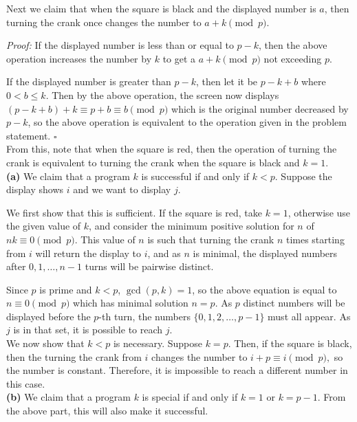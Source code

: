 \documentclass{article}
\begin{document}
     Next we claim that when the square is black and the displayed number is $a$, then turning the crank once changes the number to $a + k \pmod p$.

     \textit{Proof:} If the displayed number is less than or equal to $p - k$, then the above operation increases the number by $k$ to get a $a + k \pmod p$ not exceeding $p$.
     
     If the displayed number is greater than $p - k$, then let it be $p - k + b$ where $0 < b \leq k$. Then by the above operation, the screen now displays $(p - k + b) + k \equiv p + b \equiv b\pmod p$ which is the original number decreased by $p - k$, so the above operation is equivalent to the operation given in the problem statement. $\square$ \\

     From this, note that when the square is red, then the operation of turning the crank is equivalent to turning the crank when the square is black and $k = 1$.\\

     \textbf{(a)} We claim that a program $k$ is successful if and only if $k < p$. Suppose the display shows $i$ and we want to display $j$.
     
     We first show that this is sufficient. If the square is red, take $k = 1$, otherwise use the given value of $k$, and consider the minimum positive solution for $n$ of $nk\equiv 0 \pmod p$. This value of $n$ is such that turning the crank $n$ times starting from $i$ will return the display to $i$, and as $n$ is minimal, the displayed numbers after $0, 1, \dots, n - 1$ turns will be pairwise distinct. 
     
     Since $p$ is prime and $k < p$, $\gcd(p, k) = 1$, so the above equation is equal to $n\equiv 0 \pmod p$ which has minimal solution $n = p$. As $p$ distinct numbers will be displayed before the $p$-th turn, the numbers $\{0, 1, 2, \dots, p - 1\}$ must all appear. As $j$ is in that set, it is possible to reach $j$.\\

     We now show that $k < p$ is necessary. Suppose $k = p$. Then, if the square is black, then the turning the crank from $i$ changes the number to $i + p \equiv i \pmod p,$ so the number is constant. Therefore, it is impossible to reach a different number in this case. \\

     \textbf{(b)} We claim that a program $k$ is special if and only if $k = 1$ or $k = p - 1$. From the above part, this will also make it successful.
\end{document}

